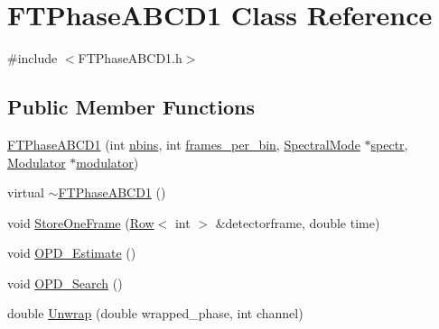 \hypertarget{classFTPhaseABCD1}{
\section{FTPhaseABCD1 Class Reference}
\label{classFTPhaseABCD1}
}


{\ttfamily \#include $<$FTPhaseABCD1.h$>$}

\subsection*{Public Member Functions}
\begin{DoxyCompactItemize}
\item 
\hyperlink{classFTPhaseABCD1_a5cbce7f05ad5e81f40f3ab40ddb3faf0}{FTPhaseABCD1} (int \hyperlink{classFTPhaseABCD1_a6346350122f18739641a583fa6bb6480}{nbins}, int \hyperlink{classFTPhaseABCD1_a5f8098aa51b878962500a3bae1eac959}{frames\_\-per\_\-bin}, \hyperlink{classSpectralMode}{SpectralMode} $\ast$\hyperlink{classFTPhaseABCD1_ab56ac2436c8084fb4601d64686338519}{spectr}, \hyperlink{classModulator}{Modulator} $\ast$\hyperlink{classFTPhaseABCD1_adc5fbcfc33764d9ccf0ab886e2d1899c}{modulator})
\item 
virtual \hyperlink{classFTPhaseABCD1_adca39b254b058fc6ebc624354bec5255}{$\sim$FTPhaseABCD1} ()
\item 
void \hyperlink{classFTPhaseABCD1_a3af0de42c400aeed38d77b2edf0e77e7}{StoreOneFrame} (\hyperlink{classRow}{Row}$<$ int $>$ \&detectorframe, double time)
\item 
void \hyperlink{classFTPhaseABCD1_a2b378a7f7486447bd702fece1f2b6ba3}{OPD\_\-Estimate} ()
\item 
void \hyperlink{classFTPhaseABCD1_a16dbd37c05bd96bebab3a22d8e98fd5d}{OPD\_\-Search} ()
\item 
double \hyperlink{classFTPhaseABCD1_ad0d37735d29375d33bf1f9e5f349a706}{Unwrap} (double wrapped\_\-phase, int channel)
\end{DoxyCompactItemize}
